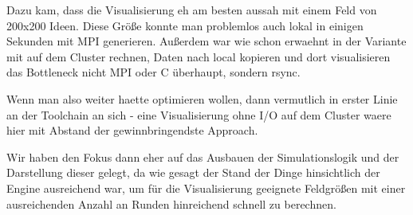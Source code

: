Dazu kam, dass die Visualisierung eh am besten aussah mit einem Feld von
200x200 Ideen. Diese Größe konnte man problemlos auch lokal in einigen
Sekunden mit MPI generieren. Außerdem war wie schon erwaehnt in der
Variante mit auf dem Cluster rechnen, Daten nach local kopieren und dort
visualisieren das Bottleneck nicht MPI oder C überhaupt, sondern rsync.

Wenn man also weiter haette optimieren wollen, dann vermutlich in erster
Linie an der Toolchain an sich - eine Visualisierung ohne I/O auf dem
Cluster waere hier mit Abstand der gewinnbringendste Approach.

Wir haben den Fokus dann eher auf das Ausbauen der Simulationslogik und
der Darstellung dieser gelegt, da wie gesagt der Stand der Dinge
hinsichtlich der Engine ausreichend war, um für die Visualisierung
geeignete Feldgrößen mit einer ausreichenden Anzahl an Runden
hinreichend schnell zu berechnen.
